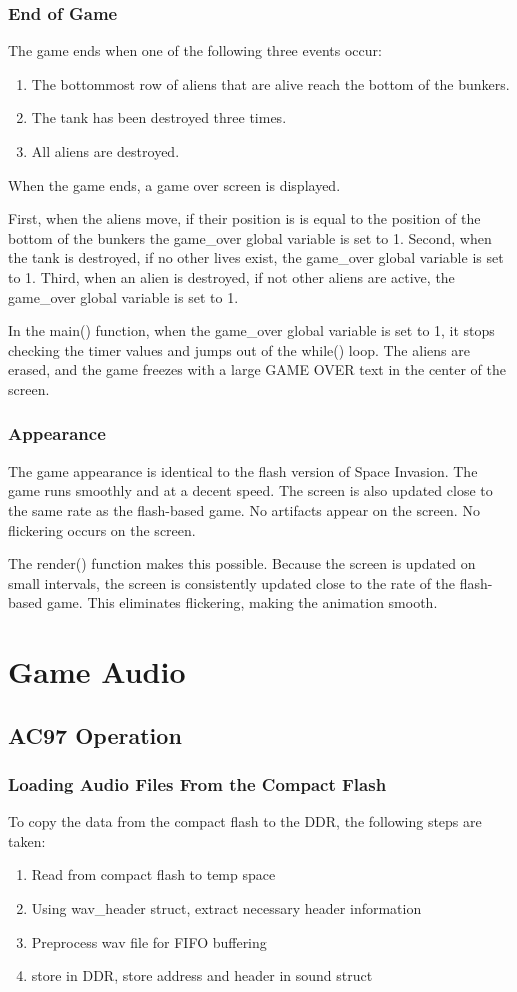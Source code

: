 \documentclass[11pt,letter,oneside]{report}
\begin{document}
\subsection{End of Game}
The game ends when one of the following three events occur:
\begin{enumerate}
\item The bottommost row of aliens that are alive reach the bottom of the bunkers.
\item The tank has been destroyed three times.
\item All aliens are destroyed.
\end{enumerate}
When the game ends, a game over screen is displayed.

First, when the aliens move, if their position is is equal to the position of the bottom of the bunkers the game\_over global variable is set to 1. Second, when the tank is destroyed, if no other lives exist, the game\_over global variable is set to 1. Third, when an alien is destroyed, if not other aliens are active, the game\_over global variable is set to 1.

In the main() function, when the game\_over global variable is set to 1, it stops checking the timer values and jumps out of the while() loop. The aliens are erased, and  the game freezes with a large GAME OVER text in the center of the screen.

\subsection{Appearance}
The game appearance is identical to the flash version of Space Invasion. The game runs smoothly and at a decent speed. The screen is also updated close to the same rate as the flash-based game. No artifacts appear on the screen. No flickering occurs on the screen.

The render() function makes this possible. Because the screen is updated on small intervals, the screen is consistently updated close to the rate of the flash-based game. This eliminates flickering, making the animation smooth.

\chapter{Game Audio}
\section{AC97 Operation}
\subsection{ Loading Audio Files From the Compact Flash}
To copy the data from the compact flash to the DDR, the following steps are taken:
\begin{enumerate}
\item Read from compact flash to temp space
\item Using wav\_header struct, extract necessary header information
\item Preprocess wav file for FIFO buffering
\item store in DDR, store address and header in sound struct
\end{enumerate}
\end{document}

